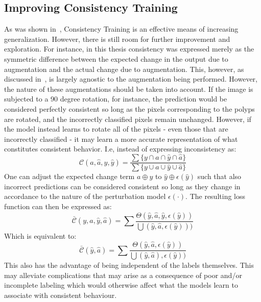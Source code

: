 \subsection{Improving Consistency Training} \label{new_closs}
    As was shown in~, Consistency Training is an effective means of increasing generalization. However, there is still room for further improvement and exploration. For instance, in this thesis consistency was expressed merely as the symmetric difference between the expected change in the output due to augmentation and the actual change due to augmentation. This, however, as discussed in~, is largely agnostic to the augmentation being performed. However, the nature of these augmentations should be taken into account. If the image is subjected to a 90 degree rotation, for instance, the prediction would be considered perfectly consistent so long as the pixels corresponding to the polyps are rotated, and the incorrectly classified pixels remain unchanged. However, if the model instead learns to rotate all of the pixels - even those that are incorrectly classified - it may learn a more accurate representation of what constitutes consistent behavior. I.e, instead of expressing inconsistency as:
\begin{equation*}
\mathcal{C}(a, \hat{a},y, \hat{y}) = \frac{\sum\{y \cap a \cap \hat{y} \cap \hat{a} \}}
{\sum\{ y \cup a \cup \hat{y} \cup \hat{a} \}}
\end{equation*}
    One can adjust the expected change term \(a\oplus y\) to \(\hat{y}\oplus \epsilon(\hat{y})\) such that also incorrect predictions can be considered consistent so long as they change in accordance to the nature of the perturbation model \(\epsilon(\cdot)\). The resulting loss function can then be expressed as:
\begin{equation*}
    \bar{\mathcal{C}}(y,a,\hat{y}, \hat{a}) = \sum \frac{\Theta(\hat{y}, \hat{a},  \hat{y}, \epsilon( \hat{y}))}{\bigcup(\hat{y}, \hat{a}, \epsilon(\hat{y})))}
\end{equation*}
Which is equivalent to:
\begin{equation*}
    \bar{\mathcal{C}}(\hat{y}, \hat{a}) = \sum \frac{\Theta(\hat{y}, \hat{a}, \epsilon( \hat{y}))}{\bigcup(\hat{y}, \hat{a}), \epsilon( \hat{y}))}
\end{equation*}
    This also has the advantage of being independent of the labels themselves. This may alleviate complications that may arise as a consequence of poor and/or incomplete labeling which would otherwise affect what the models learn to associate with consistent behaviour. 

